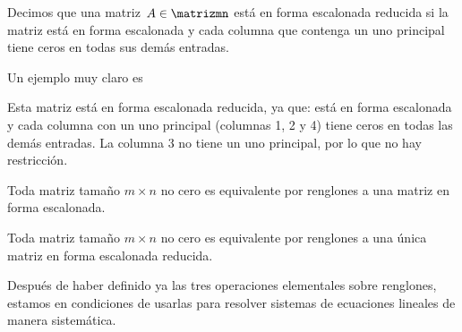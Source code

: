 \newpage

\begin{definicion}{}{}
    Decimos que una matriz $A \in \matrizmn$ está en forma escalonada reducida si la matriz está en forma escalonada y cada columna que contenga un uno principal tiene ceros en todas sus demás entradas.
\end{definicion}

\begin{examplebox}{}{}
    Un ejemplo muy claro es
    \begin{matrizn}
    \end{matrizn}
    Esta matriz está en forma escalonada reducida, ya que: está en forma escalonada y cada columna con un uno principal (columnas 1, 2 y 4) tiene ceros en todas las demás entradas. La columna 3 no tiene un uno principal, por lo que no hay restricción.
\end{examplebox}

\begin{theorem}{}{}
    Toda matriz tamaño $m \times n$ no cero es equivalente por renglones a una matriz en forma escalonada.
\end{theorem}

\begin{theorem}{}{}
    Toda matriz tamaño $m \times n$ no cero es equivalente por renglones a una única matriz en forma escalonada reducida.
\end{theorem}

Después de haber definido ya las tres operaciones elementales sobre renglones, estamos en condiciones de usarlas para resolver sistemas de ecuaciones lineales de manera sistemática.

